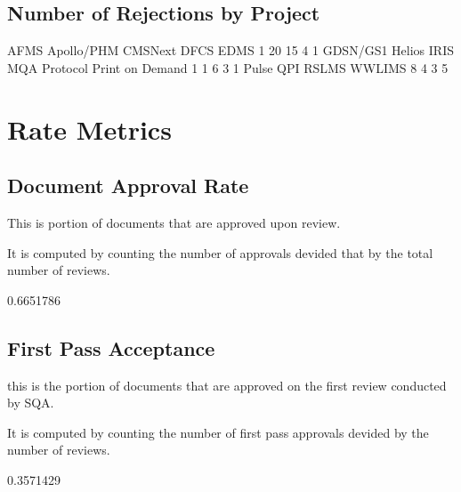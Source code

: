 \documentclass{article}
\begin{document}
\subsection{Number of Rejections by Project}

\begin{Schunk}
\begin{Soutput}
           AFMS      Apollo/PHM         CMSNext            DFCS            EDMS 
              1              20              15               4               1 
       GDSN/GS1          Helios            IRIS    MQA Protocol Print on Demand 
              1               1               6               3               1 
          Pulse             QPI           RSLMS          WWLIMS 
              8               4               3               5 
\end{Soutput}
\end{Schunk}



\section{Rate Metrics}
\subsection{Document Approval Rate}
This is portion of documents that are approved upon review.

It is computed by counting the number of approvals devided that by the total number of reviews.

\begin{Schunk}
\begin{Soutput}
[1] 0.6651786
\end{Soutput}
\end{Schunk}

\subsection{First Pass Acceptance}
this is the portion of documents that are approved on the first review conducted
by SQA.

It is computed by counting the number of first pass approvals devided by
the number of reviews.

\begin{Schunk}
\begin{Soutput}
[1] 0.3571429
\end{Soutput}
\end{Schunk}
\end{document}
